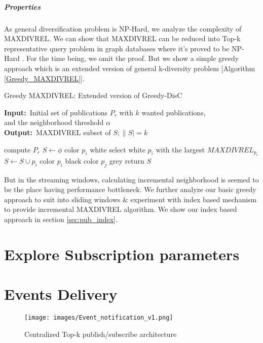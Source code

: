 \documentclass[a4paper,12pt,oneside]{book}
\renewcommand{\algorithmicrequire}{\textbf{Input:}}
\renewcommand{\algorithmicensure}{\textbf{Output:}}
\theoremstyle{definition}
\theoremstyle{remark}
\begin{document}

\subparagraph{Properties}
As general diversification problem is NP-Hard, we analyze the complexity of MAXDIVREL. We can show that MAXDIVREL can be reduced into Top-k representative query problem in graph databases where it's proved to be NP-Hard \cite{Ranu2014a}. For the time being, we omit the proof. But we show a simple greedy approach which is an extended version of general k-diversity problem [Algorithm \ref{Greedy_MAXDIVREL}]. 

\begin{algorithm} 
  \caption{Greedy MAXDIVREL: Extended version of Greedy-DisC}
  \label{Greedy_MAXDIVREL} 
  \algorithmicrequire \ Initial set of publications $P_r$ with $k$ wanted publications,\\ and the neighborhood threshold $\alpha$ \\
  \algorithmicensure \ MAXDIVREL subset of $S;\|S|=k$
  \begin{algorithmic}    
    \State compute $P_r$
    \State $S \leftarrow \phi$
    \State color $p_i$ white
    \EndFor
    \State select white $p_i$ with the largest $MAXDIVREL_{p_i}$
    \State $S \leftarrow S \cup {p_i}$
    \State color $p_i$ black
    \State color $p_j$ grey
    \EndFor
    \EndWhile
    \State return $S$    
  \end{algorithmic} 
\end{algorithm} 

But in the streaming windows, calculating incremental neighborhood is seemed to be the place having performance bottleneck. We further analyze our basic greedy approach to suit into sliding windows \& experiment with index based mechanism to provide incremental MAXDIVREL algorithm. We show our index based approach in section \ref{sec:pub_index}.

\section{Explore Subscription parameters}
\label{sec:sub_param}

\section{Events Delivery}
\label{sec:delivery}
\begin{figure}[H]
\begin{center}
\texttt{[image: images/Event\_notification\_v1.png]}
\caption{Centralized Top-k publish/subscribe architecture}
\label{img:centralized_pub_sub}
\end{center}
\end{figure}
\end{document}
